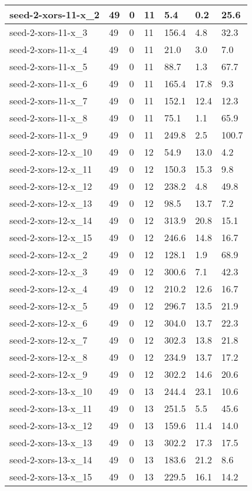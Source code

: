 \begin{scriptsize}
\begin{longtable}{|p{5cm}|l|l|l|l|l|l|}
seed-2-xors-11-x\_2&49&0&11&5.4&0.2&25.6 \\ \hline 
seed-2-xors-11-x\_3&49&0&11&156.4&4.8&32.3 \\ \hline 
seed-2-xors-11-x\_4&49&0&11&21.0&3.0&7.0 \\ \hline 
seed-2-xors-11-x\_5&49&0&11&88.7&1.3&67.7 \\ \hline 
seed-2-xors-11-x\_6&49&0&11&165.4&17.8&9.3 \\ \hline 
seed-2-xors-11-x\_7&49&0&11&152.1&12.4&12.3 \\ \hline 
seed-2-xors-11-x\_8&49&0&11&75.1&1.1&65.9 \\ \hline 
seed-2-xors-11-x\_9&49&0&11&249.8&2.5&100.7 \\ \hline 
seed-2-xors-12-x\_10&49&0&12&54.9&13.0&4.2 \\ \hline 
seed-2-xors-12-x\_11&49&0&12&150.3&15.3&9.8 \\ \hline 
seed-2-xors-12-x\_12&49&0&12&238.2&4.8&49.8 \\ \hline 
seed-2-xors-12-x\_13&49&0&12&98.5&13.7&7.2 \\ \hline 
seed-2-xors-12-x\_14&49&0&12&313.9&20.8&15.1 \\ \hline 
seed-2-xors-12-x\_15&49&0&12&246.6&14.8&16.7 \\ \hline 
seed-2-xors-12-x\_2&49&0&12&128.1&1.9&68.9 \\ \hline 
seed-2-xors-12-x\_3&49&0&12&300.6&7.1&42.3 \\ \hline 
seed-2-xors-12-x\_4&49&0&12&210.2&12.6&16.7 \\ \hline 
seed-2-xors-12-x\_5&49&0&12&296.7&13.5&21.9 \\ \hline 
seed-2-xors-12-x\_6&49&0&12&304.0&13.7&22.3 \\ \hline 
seed-2-xors-12-x\_7&49&0&12&302.3&13.8&21.8 \\ \hline 
seed-2-xors-12-x\_8&49&0&12&234.9&13.7&17.2 \\ \hline 
seed-2-xors-12-x\_9&49&0&12&302.2&14.6&20.6 \\ \hline 
seed-2-xors-13-x\_10&49&0&13&244.4&23.1&10.6 \\ \hline 
seed-2-xors-13-x\_11&49&0&13&251.5&5.5&45.6 \\ \hline 
seed-2-xors-13-x\_12&49&0&13&159.6&11.4&14.0 \\ \hline 
seed-2-xors-13-x\_13&49&0&13&302.2&17.3&17.5 \\ \hline 
seed-2-xors-13-x\_14&49&0&13&183.6&21.2&8.6 \\ \hline 
seed-2-xors-13-x\_15&49&0&13&229.5&16.1&14.2 \\ \hline 

\end{longtable}
\end{scriptsize}
